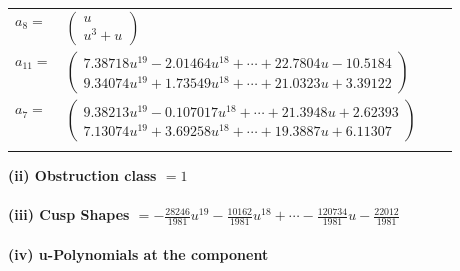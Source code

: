 \documentclass[1p]{elsarticle_modified}
\theoremstyle{definition}
\begin{document}
\begin{tabular}{m{7pt} m{180pt} m{7pt} m{180pt} }
\flushright $a_{8}=$&$\begin{pmatrix}u\\u^3+u\end{pmatrix}$ \\
\flushright $a_{11}=$&$\begin{pmatrix}7.38718 u^{19}-2.01464 u^{18}+\cdots+22.7804 u-10.5184\\9.34074 u^{19}+1.73549 u^{18}+\cdots+21.0323 u+3.39122\end{pmatrix}$ \\
\flushright $a_{7}=$&$\begin{pmatrix}9.38213 u^{19}-0.107017 u^{18}+\cdots+21.3948 u+2.62393\\7.13074 u^{19}+3.69258 u^{18}+\cdots+19.3887 u+6.11307\end{pmatrix}$\\&\end{tabular}
\flushleft \textbf{(ii) Obstruction class $= 1$}\\~\\
\flushleft \textbf{(iii) Cusp Shapes $= -\frac{28246}{1981} u^{19}-\frac{10162}{1981} u^{18}+\cdots-\frac{120734}{1981} u-\frac{22012}{1981}$}\\~\\
\newpage\renewcommand{\arraystretch}{1}
\flushleft \textbf{(iv) u-Polynomials at the component}\newline \\
\end{document}
